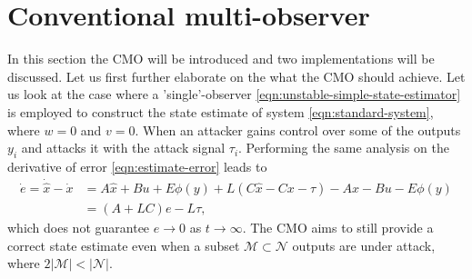 \section{Conventional multi-observer}\label{ch:cmo}
In this section the CMO will be introduced and two implementations will be discussed. Let us first further elaborate on the what the CMO should achieve. Let us look at the case where a 'single'-observer \eqref{eqn:unstable-simple-state-estimator} is employed to construct the state estimate of system \eqref{eqn:standard-system}, where $w=0$ and $v=0$. When an attacker gains control over some of the outputs $y_i$ and attacks it with the attack signal $\tau_i$. Performing the same analysis on the derivative of error \eqref{eqn:estimate-error} leads to
\begin{equation*}
    \begin{split}
        \dot{e} = \dot{\hat{x}} - \dot{x} &= A\hat{x} + Bu + E\phi(y) + L(C\hat{x} - Cx - \tau) - Ax - Bu - E\phi(y) \\
        &= (A+LC)e - L\tau,
    \end{split}
\end{equation*}
which does not guarantee $e \rightarrow 0$ as $t \rightarrow \infty$. The CMO aims to still provide a correct state estimate even when a subset $\mathcal{M} \subset \mathcal{N}$ outputs are under attack, where $2|\mathcal{M}| < |\mathcal{N}|$. 


